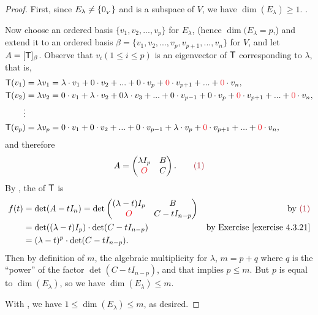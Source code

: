 \begin{proof}
First, since \(E_{\lambda} \ne \{ 0_{_V} \}\) and is a subspace of \(V\), we have \(\dim(E_{\lambda}) \ge 1\). .

\sloppy Now choose an ordered basis \(\{ v_1, v_2, ..., v_p \}\) for \(E_{\lambda}\), (hence \(\dim(E_{\lambda} = p\),)
and extend it to an ordered basis \(\beta = \{ v_1, v_2, ..., v_p, v_{p + 1}, ..., v_n \}\) for \(V\), and let \(A = [\textsf{T}]_{\beta}\).
Observe that \(v_i (1 \le i \le p)\) is an eigenvector of \(\textsf{T}\) corresponding to \(\lambda\),
that is,
\begin{align*}
    \T(v_1) & = \lambda v_1 = \lambda \cdot v_1 + 0 \cdot v_2 + ... + 0 \cdot v_p + \RED{0} \cdot v_{p + 1} + ... + \RED{0} \cdot v_n, \\
    \T(v_2) & = \lambda v_2 = 0 \cdot v_1 + \lambda \cdot v_2 + 0 \lambda \cdot v_3 + ... + 0 \cdot v_{p - 1} + 0 \cdot v_p + \RED{0} \cdot v_{p + 1} + ... + \RED{0} \cdot v_n, \\
    \vdots & \\
    \T(v_p) & = \lambda v_p = 0 \cdot v_1 + 0 \cdot v_2 + ... + 0 \cdot v_{p - 1} + \lambda \cdot v_p + \RED{0} \cdot v_{p + 1} + ... + \RED{0} \cdot v_n,
\end{align*}
and therefore
\[
    A = \begin{pmatrix} \lambda I_p & B \\ \RED{O} & C \end{pmatrix}. \quad \quad \MAROON{(1)}
\]
By , the \CPOLY{} of \(\textsf{T}\) is
\begin{align*}
    f(t) & = \det(A - tI_n) = \det \begin{pmatrix} (\lambda - t) I_p & B \\ \RED{O} & C - tI_{n - p} \end{pmatrix} & \text{by \MAROON{(1)}} \\
         & = \det((\lambda - t) I_p) \cdot \det(C - tI_{n - p}) & \text{by \EXEC{4.3.21}} \\
         & = (\lambda - t)^p \cdot \det(C - tI_{n - p}).
\end{align*}
Then by definition of \(m\), the algebraic multiplicity for \(\lambda\), \(m = p + q\) where \(q\) is the ``power'' of the factor \(\det(C - tI_{n - p})\), and that implies \(p \le m\).
But \(p\) is equal to \(\dim(E_{\lambda})\), so we have \(\dim(E_{\lambda}) \le m\).

With , we have \(1 \le \dim(E_{\lambda}) \le m\), as desired.
\end{proof}

